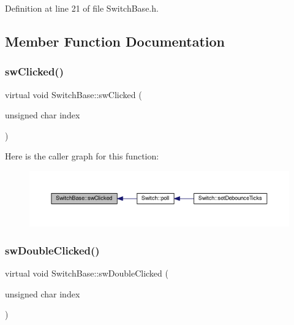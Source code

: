 Definition at line 21 of file Switch\+Base.\+h.



\subsection{Member Function Documentation}
\mbox{\label{class_switch_base_aa351081e25dc6a74959c1ec49f972fb5}} 
\subsubsection{\texorpdfstring{sw\+Clicked()}{swClicked()}}
{\footnotesize\ttfamily virtual void Switch\+Base\+::sw\+Clicked (\begin{DoxyParamCaption}\item[{unsigned char}]{index }\end{DoxyParamCaption})\hspace{0.3cm}{\ttfamily [pure virtual]}}

Here is the caller graph for this function\+:
\nopagebreak
\begin{figure}[H]
\begin{center}
\leavevmode
\includegraphics[width=350pt]{d8/d8e/class_switch_base_aa351081e25dc6a74959c1ec49f972fb5_icgraph}
\end{center}
\end{figure}
\mbox{\label{class_switch_base_a120bac96086b295783809866e3afd390}} 
\subsubsection{\texorpdfstring{sw\+Double\+Clicked()}{swDoubleClicked()}}
{\footnotesize\ttfamily virtual void Switch\+Base\+::sw\+Double\+Clicked (\begin{DoxyParamCaption}\item[{unsigned char}]{index }\end{DoxyParamCaption})\hspace{0.3cm}{\ttfamily [pure virtual]}}


